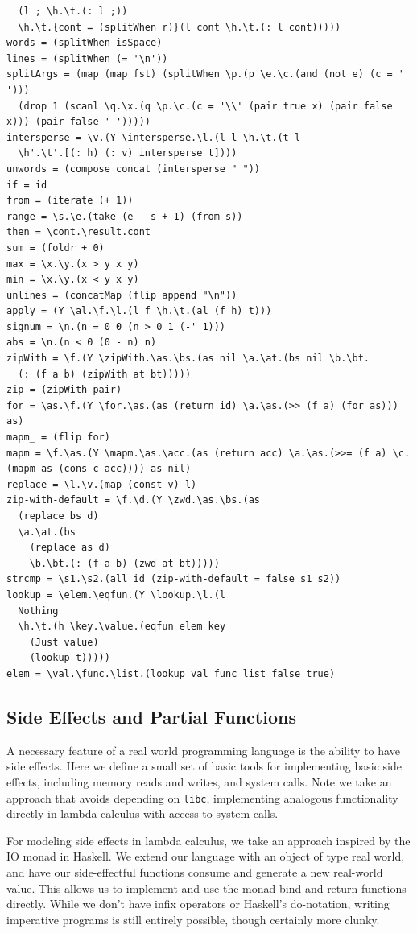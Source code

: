 \begin{verbatim}
  (l ; \h.\t.(: l ;))
  \h.\t.{cont = (splitWhen r)}(l cont \h.\t.(: l cont)))))
words = (splitWhen isSpace)
lines = (splitWhen (= '\n'))
splitArgs = (map (map fst) (splitWhen \p.(p \e.\c.(and (not e) (c = ' '))) 
  (drop 1 (scanl \q.\x.(q \p.\c.(c = '\\' (pair true x) (pair false x))) (pair false ' ')))))
intersperse = \v.(Y \intersperse.\l.(l l \h.\t.(t l 
  \h'.\t'.[(: h) (: v) intersperse t])))
unwords = (compose concat (intersperse " "))
if = id
from = (iterate (+ 1))
range = \s.\e.(take (e - s + 1) (from s))
then = \cont.\result.cont
sum = (foldr + 0)
max = \x.\y.(x > y x y)
min = \x.\y.(x < y x y)
unlines = (concatMap (flip append "\n"))
apply = (Y \al.\f.\l.(l f \h.\t.(al (f h) t))) 
signum = \n.(n = 0 0 (n > 0 1 (-' 1)))
abs = \n.(n < 0 (0 - n) n)
zipWith = \f.(Y \zipWith.\as.\bs.(as nil \a.\at.(bs nil \b.\bt.
  (: (f a b) (zipWith at bt)))))
zip = (zipWith pair)
for = \as.\f.(Y \for.\as.(as (return id) \a.\as.(>> (f a) (for as))) as)
mapm_ = (flip for)
mapm = \f.\as.(Y \mapm.\as.\acc.(as (return acc) \a.\as.(>>= (f a) \c.(mapm as (cons c acc)))) as nil)
replace = \l.\v.(map (const v) l)
zip-with-default = \f.\d.(Y \zwd.\as.\bs.(as 
  (replace bs d)
  \a.\at.(bs 
    (replace as d)
    \b.\bt.(: (f a b) (zwd at bt)))))
strcmp = \s1.\s2.(all id (zip-with-default = false s1 s2))
lookup = \elem.\eqfun.(Y \lookup.\l.(l 
  Nothing 
  \h.\t.(h \key.\value.(eqfun elem key
    (Just value)
    (lookup t)))))
elem = \val.\func.\list.(lookup val func list false true)
\end{verbatim}

\subsection{Side Effects and Partial Functions}
A necessary feature of a real world programming language is the ability to have
side effects. Here we define a small set of basic tools for implementing basic
side effects, including memory reads and writes, and system calls. Note we take
an approach that avoids depending on \texttt{libc}, implementing analogous
functionality directly in lambda calculus with access to system calls. 

For modeling side effects in lambda calculus, we take an approach inspired by
the IO monad in Haskell. We extend our language with an object of type real
world, and have our side-effectful functions consume and generate a new
real-world value. This allows us to implement and use the monad bind and return
functions directly. While we don't have infix operators or Haskell's
do-notation, writing imperative programs is still entirely possible, though
certainly more clunky. 

